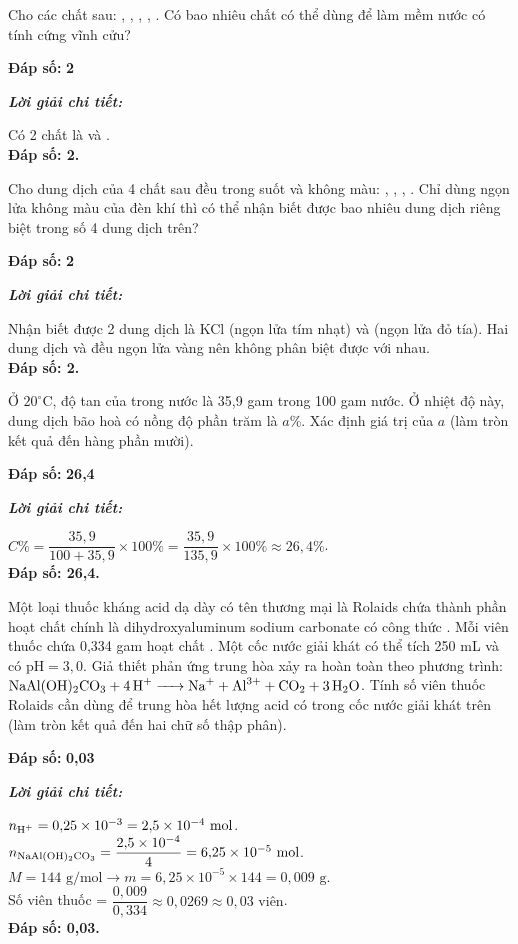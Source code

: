 \documentclass[11pt,a4paper]{article}
\def\loigiai#1{
\par\begingroup\color{blue!80!black}\small
\noindent\textbf{\textit{Lời giải chi tiết:}}\par
#1\par\endgroup}
\begin{document}
\begin{ex}
Cho các chất sau: , , , , . Có bao nhiêu chất có thể dùng để làm mềm nước có tính cứng vĩnh cửu?
\par\noindent\textbf{Đáp số:} \textbf{\color{red}2}
\loigiai{
Có 2 chất là  và .\\
\textbf{Đáp số: 2.}}
\end{ex}

\begin{ex}
Cho dung dịch của 4 chất sau đều trong suốt và không màu: , , , . Chỉ dùng ngọn lửa không màu của đèn khí thì có thể nhận biết được bao nhiêu dung dịch riêng biệt trong số 4 dung dịch trên?
\par\noindent\textbf{Đáp số:} \textbf{\color{red}2}
\loigiai{
Nhận biết được 2 dung dịch là KCl (ngọn lửa tím nhạt) và \ce{LiNO3} (ngọn lửa đỏ tía). Hai dung dịch \ce{NaCl} và \ce{Na2SO4} đều ngọn lửa vàng nên không phân biệt được với nhau.\\
\textbf{Đáp số: 2.}}
\end{ex}

\begin{ex}
Ở $20^\circ\text{C}$, độ tan của  trong nước là 35,9 gam trong 100 gam nước. Ở nhiệt độ này, dung dịch  bão hoà có nồng độ phần trăm là $a\%$. Xác định giá trị của $a$ (làm tròn kết quả đến hàng phần mười).
\par\noindent\textbf{Đáp số:} \textbf{\color{red}26,4}
\loigiai{
$C\% = \dfrac{35{,}9}{100 + 35{,}9} \times 100\% = \dfrac{35{,}9}{135{,}9} \times 100\% \approx 26{,}4\%$.\\
\textbf{Đáp số: 26,4.}}
\end{ex}

\begin{ex}
Một loại thuốc kháng acid dạ dày có tên thương mại là Rolaids chứa thành phần hoạt chất chính là dihydroxyaluminum sodium carbonate có công thức . Mỗi viên thuốc chứa 0,334 gam hoạt chất . Một cốc nước giải khát có thể tích 250 mL và có $\text{pH} = 3{,}0$. Giả thiết phản ứng trung hòa xảy ra hoàn toàn theo phương trình: $\ce{NaAl(OH)2CO3 + 4H+ -> Na+ + Al^3+ + CO2 + 3H2O}$. Tính số viên thuốc Rolaids cần dùng để trung hòa hết lượng acid có trong cốc nước giải khát trên (làm tròn kết quả đến hai chữ số thập phân).
\par\noindent\textbf{Đáp số:} \textbf{\color{red}0,03}
\loigiai{
$n_{\ce{H+}} = 0{,}25 \times 10^{-3} = 2{,}5\times 10^{-4}\text{ mol}$.\\
$n_{\ce{NaAl(OH)2CO3}} = \dfrac{2{,}5\times 10^{-4}}{4} = 6{,}25\times 10^{-5}\text{ mol}$.\\
$M = 144\text{ g/mol} \rightarrow m = 6{,}25\times 10^{-5} \times 144 = 0{,}009\text{ g}$.\\
Số viên thuốc = $\dfrac{0{,}009}{0{,}334} \approx 0{,}0269 \approx 0{,}03\text{ viên}$.\\
\textbf{Đáp số: 0,03.}}
\end{ex}
\end{document}

